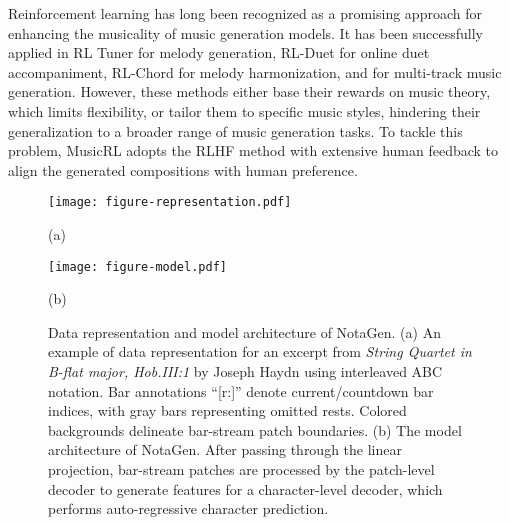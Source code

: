 Reinforcement learning has long been recognized as a promising approach for enhancing the musicality of music generation models. It has been successfully applied in RL Tuner \cite{jaques2017tuning} for melody generation, RL-Duet \cite{jiang2020rl} for online duet accompaniment, RL-Chord \cite{ji2023rl} for melody harmonization, and \cite{guo2022fine} for multi-track music generation. However, these methods either base their rewards on music theory, which limits flexibility, or tailor them to specific music styles, hindering their generalization to a broader range of music generation tasks. To tackle this problem, MusicRL \cite{cideron2024musicrl} adopts the RLHF method with extensive human feedback to align the generated compositions with human preference.

\begin{figure*}[!ht]
    \centering
    \begin{minipage}{0.49\textwidth}
        \centering
        \texttt{[image: figure-representation.pdf]}
        \caption*{(a)}
    \end{minipage}\hfill
    \begin{minipage}{0.49\textwidth}
        \centering
        \texttt{[image: figure-model.pdf]}
        \caption*{(b)}
    \end{minipage}\hfill
    \caption{Data representation and model architecture of NotaGen. (a) An example of data representation for an excerpt from \textit{String Quartet in B-flat major, Hob.III:1} by Joseph Haydn using interleaved ABC notation. Bar annotations ``[r:]'' denote current/countdown bar indices, with gray bars representing omitted rests. Colored backgrounds delineate bar-stream patch boundaries. (b) The model architecture of NotaGen. After passing through the linear projection, bar-stream patches are processed by the patch-level decoder to generate features for a character-level decoder, which performs auto-regressive character prediction.}
    \label{fig:Figure 2}
\end{figure*}